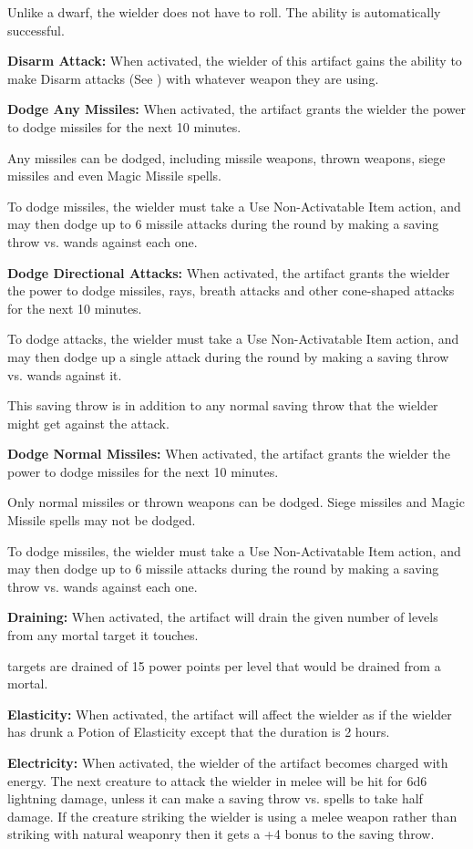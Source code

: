 \begin{multicols*}{2}
Unlike a dwarf, the wielder does not have to roll. The ability is automatically successful.

\textbf{Disarm Attack:} When activated, the wielder of this artifact gains the ability to make Disarm attacks (See ) with whatever weapon they are using.

\textbf{Dodge Any Missiles:} When activated, the artifact grants the wielder the power to dodge missiles for the next 10 minutes.

Any missiles can be dodged, including missile weapons, thrown weapons, siege missiles and even Magic Missile spells.

To dodge missiles, the wielder must take a Use Non-Activatable Item action, and may then dodge up to 6 missile attacks during the round by making a saving throw vs. wands against each one.

\textbf{Dodge Directional Attacks:} When activated, the artifact grants the wielder the power to dodge missiles, rays, breath attacks and other cone-shaped attacks for the next 10 minutes.

To dodge attacks, the wielder must take a Use Non-Activatable Item action, and may then dodge up a single attack during the round by making a saving throw vs. wands against it.

This saving throw is in addition to any normal saving throw that the wielder might get against the attack.

\textbf{Dodge Normal Missiles:} When activated, the artifact grants the wielder the power to dodge missiles for the next 10 minutes.

Only normal missiles or thrown weapons can be dodged. Siege missiles and Magic Missile spells may not be dodged.

To dodge missiles, the wielder must take a Use Non-Activatable Item action, and may then dodge up to 6 missile attacks during the round by making a saving throw vs. wands against each one.

\textbf{Draining:} When activated, the artifact will drain the given number of levels from any mortal target it touches.

 targets are drained of 15 power points per level that would be drained from a mortal.

\textbf{Elasticity:} When activated, the artifact will affect the wielder as if the wielder has drunk a Potion of Elasticity except that the duration is 2 hours.

\textbf{Electricity:} When activated, the wielder of the artifact becomes charged with energy. The next creature to attack the wielder in melee will be hit for 6d6 lightning damage, unless it can make a saving throw vs. spells to take half damage. If the creature striking the wielder is using a melee weapon rather than striking with natural weaponry then it gets a +4 bonus to the saving throw.


\end{multicols*}
